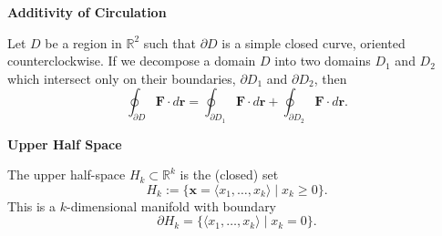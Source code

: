\documentclass{article}
\newcommand{\R}{\mathbb{R}}
\newenvironment{definition}[1]{
    \par\noindent\textbf{#1}\par\noindent
}{
    \par \vspace{0.5cm}
}
\begin{document}
\begin{definition}{Additivity of Circulation}
Let \(D\) be a region in \(\R^2\) such that \(\partial D\) is a simple closed curve, oriented counterclockwise. If we decompose a domain \(D\) into two domains \(D_1\) and \(D_2\) which intersect only on their boundaries, \(\partial D_1\) and \(\partial D_2\), then
\[ \oint_{\partial D} \bm{F} \cdot d\bm{r} = \oint_{\partial D_1} \bm{F} \cdot d\bm{r} + \oint_{\partial D_2} \bm{F} \cdot d\bm{r}. \]
\end{definition}


\begin{definition}{Upper Half Space}
The upper half-space \(H_k \subset \R^k\) is the (closed) set
\[ H_k := \{\bm{x} = \langle x_1, \ldots, x_k \rangle \mid x_k \geq 0\}. \]
This is a \(k\)-dimensional manifold with boundary
\[ \partial H_k = \{\langle x_1, \ldots, x_k \rangle \mid x_k = 0\}. \]
\end{definition}
\end{document}
